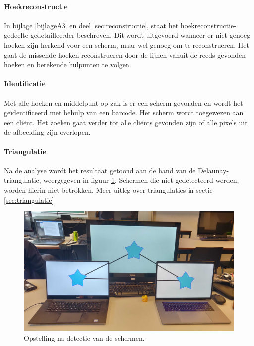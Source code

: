 \paragraph{Hoekreconstructie}
In bijlage \ref{bijlageA3} en deel \ref{sec:reconstructie}, staat het hoekreconstructie-gedeelte gedetailleerder beschreven. Dit wordt uitgevoerd wanneer er niet genoeg hoeken zijn herkend voor een scherm, maar wel genoeg om te reconstrueren. Het gaat de missende hoeken reconstrueren door de lijnen vanuit de reeds gevonden hoeken en berekende hulpunten te volgen.

\paragraph{Identificatie}
Met alle hoeken en middelpunt op zak is er een scherm gevonden en wordt het geïdentificeerd met behulp van een barcode. Het scherm wordt toegewezen aan een cliënt. Het zoeken gaat verder tot alle cliënts gevonden zijn of alle pixels uit de afbeelding zijn overlopen.

\paragraph{Triangulatie}
Na de analyse wordt het resultaat getoond aan de hand van de Delaunay-triangulatie, weergegeven in figuur \ref{fig:triang}. Schermen die niet gedetecteerd werden, worden hierin niet betrokken. Meer uitleg over triangulaties in sectie \ref{sec:triangulatie}
\begin{figure}[H]
	\centering
	\includegraphics[scale=0.09]{img/triang.jpg}
	\caption{Opstelling na detectie van de schermen.}
	\label{fig:triang}
\end{figure}

